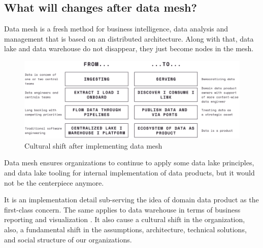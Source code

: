 \documentclass[12pt, a4paper]{book}
\begin{document}
\subsection{What will changes after data mesh?}
Data mesh is a fresh method for business intelligence, data analysis and management that is based on an distributed architecture. Along with that, data lake and data warehouse do not disappear, they just become nodes in the mesh. \cite{machado2022data,shiftkpmg}

\begin{figure}[h]
	\begin{framed}
		\centering
		\includegraphics[width=16.5cm]{CulturalShift.png}
		\caption{Cultural shift after implementing data mesh}
		\label{culturalshift}
	\end{framed}
\end{figure}

Data mesh ensures organizations to continue to apply some data lake principles, and data lake tooling for internal implementation of data products, but it would not be the centerpiece anymore.

It is an implementation detail sub-serving the idea of domain data product as the first-class concern. The same applies to data warehouse in terms of business reporting and visualization \cite{shiftkpmg}. It also cause a cultural shift in the organization, also, a fundamental shift in the assumptions, architecture, technical solutions, and social structure of our organizations. \cite{datamesh2022ch1}
\end{document}
